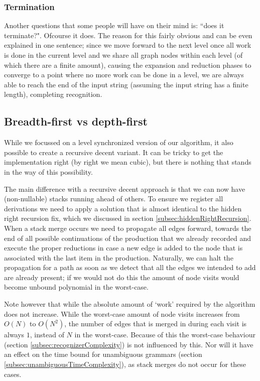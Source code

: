 \documentclass[a4paper,10pt]{article}
\begin{document}
\subsubsection{Termination}
Another questions that some people will have on their mind is: ``does it terminate?". Ofcourse it does. The reason for this fairly obvious and can be even explained in one sentence; since we move forward to the next level once all work is done in the current level and we share all graph nodes within each level (of which there are a finite amount), causing the expansion and reduction phases to converge to a point where no more work can be done in a level, we are always able to reach the end of the input string (assuming the input string has a finite length), completing recognition.

\subsection{Breadth-first vs depth-first}
\label{sec:breadthFirstVsDepthFirst}

While we focussed on a level synchronized version of our algorithm, it also possible to create a recursive decent variant. It can be tricky to get the implementation right (by right we mean cubic), but there is nothing that stands in the way of this possibility.

The main difference with a recursive decent approach is that we can now have (non-nullable) stacks running ahead of others. To ensure we register all derivations we need to apply a solution that is almost identical to the hidden right recursion fix, which we discussed in section \ref{subsec:hiddenRightRecursion}. When a stack merge occurs we need to propagate all edges forward, towards the end of all possible continuations of the production that we already recorded and execute the proper reductions in case a new edge is added to the node that is associated with the last item in the production. Naturally, we can halt the propagation for a path as soon as we detect that all the edges we intended to add are already present; if we would not do this the amount of node visits would become unbound polynomial in the worst-case.

Note however that while the absolute amount of `work' required by the algorithm does not increase. While the worst-case amount of node visits increases from $O(N)$ to $O(N^2)$, the number of edges that is merged in during each visit is always $1$, instead of $N$ in the worst-case. Because of this the worst-case behaviour (section \ref{subsec:recognizerComplexity}) is not influenced by this. Nor will it have an effect on the time bound for unambiguous grammars (section \ref{subsec:unambiguousTimeComplexity}), as stack merges do not occur for these cases.
\end{document}
